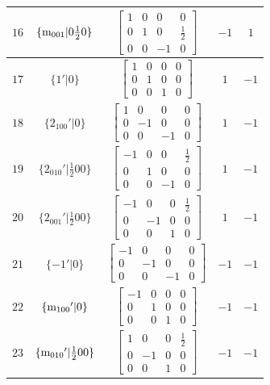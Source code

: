 \documentclass[fleqn,8pt]{jsarticle}
\begin{document}
\begin{longtable}{ccccc}
$ 16 $ & $ \{{\rm m}_{001}|0 \frac{1}{2} 0\} $ & $ \begin{bmatrix} 1 & 0 & 0 & 0 \\ 0 & 1 & 0 & \frac{1}{2} \\ 0 & 0 & -1 & 0 \end{bmatrix} $ & $ -1 $ & $ 1 $ \\ \hline
$ 17 $ & $ \{1{}'|0\} $ & $ \begin{bmatrix} 1 & 0 & 0 & 0 \\ 0 & 1 & 0 & 0 \\ 0 & 0 & 1 & 0 \end{bmatrix} $ & $ 1 $ & $ -1 $ \\ \hline
$ 18 $ & $ \{2{}_{100}{}'|0\} $ & $ \begin{bmatrix} 1 & 0 & 0 & 0 \\ 0 & -1 & 0 & 0 \\ 0 & 0 & -1 & 0 \end{bmatrix} $ & $ 1 $ & $ -1 $ \\ \hline
$ 19 $ & $ \{2{}_{010}{}'|\frac{1}{2} 0 0\} $ & $ \begin{bmatrix} -1 & 0 & 0 & \frac{1}{2} \\ 0 & 1 & 0 & 0 \\ 0 & 0 & -1 & 0 \end{bmatrix} $ & $ 1 $ & $ -1 $ \\ \hline
$ 20 $ & $ \{2{}_{001}{}'|\frac{1}{2} 0 0\} $ & $ \begin{bmatrix} -1 & 0 & 0 & \frac{1}{2} \\ 0 & -1 & 0 & 0 \\ 0 & 0 & 1 & 0 \end{bmatrix} $ & $ 1 $ & $ -1 $ \\ \hline
$ 21 $ & $ \{-1{}'|0\} $ & $ \begin{bmatrix} -1 & 0 & 0 & 0 \\ 0 & -1 & 0 & 0 \\ 0 & 0 & -1 & 0 \end{bmatrix} $ & $ -1 $ & $ -1 $ \\ \hline
$ 22 $ & $ \{{\rm m}_{100}{}'|0\} $ & $ \begin{bmatrix} -1 & 0 & 0 & 0 \\ 0 & 1 & 0 & 0 \\ 0 & 0 & 1 & 0 \end{bmatrix} $ & $ -1 $ & $ -1 $ \\ \hline
$ 23 $ & $ \{{\rm m}_{010}{}'|\frac{1}{2} 0 0\} $ & $ \begin{bmatrix} 1 & 0 & 0 & \frac{1}{2} \\ 0 & -1 & 0 & 0 \\ 0 & 0 & 1 & 0 \end{bmatrix} $ & $ -1 $ & $ -1 $ \\ \hline

\end{longtable}
\end{document}
